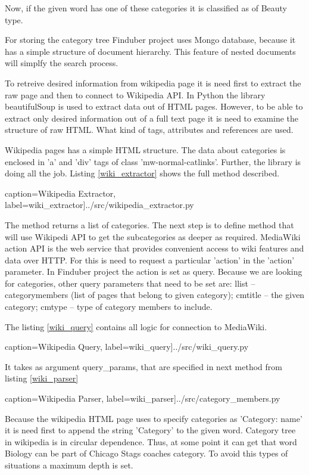 Now, if the given word has one of these categories it is classified as of Beauty type. 

For storing the category tree Finduber project uses Mongo database, because it has a simple structure of document hierarchy. This feature of nested documents will simplfy the search process. 

To retreive desired information from wikipedia page it is need first to extract the raw page and then to connect to Wikipedia API. In Python the library beautifulSoup is used to extract data out of HTML pages. However, to be able to extract only desired information out of a full text page it is need to examine the structure of raw HTML. What kind of tags, attributes and references are used.

Wikipedia pages has a simple HTML structure. The data about categories is enclosed in 'a' and 'div' tags of class 'mw-normal-catlinks'. Further, the library is doing all the job. Listing \ref{wiki_extractor} shows the full method described.

 caption={Wikipedia Extractor}, label=wiki_extractor]{../src/wikipedia_extractor.py}

The method returns a list of categories. The next step is to define method that will use Wikipedi API to get the subcategories as deeper as required. MediaWiki action API is the web service that provides convenient access to wiki features and data over HTTP. For this is need to request a particular 'action' in the 'action' parameter. In Finduber project the action is set as query. Because we are looking for categories, other query parameters that need to be set are: llist -- categorymembers (list of pages that belong to given category); cmtitle -- the given category; cmtype -- type of category members to include.

The listing \ref{wiki_query} contains all logic for connection to MediaWiki. 

 caption={Wikipedia Query}, label=wiki_query]{../src/wiki_query.py}

It takes as argument query\_params, that are specified in next method from listing \ref{wiki_parser}

 caption={Wikipedia Parser}, label=wiki_parser]{../src/category_members.py}

Because the wikipedia HTML page uses to specify categories as 'Category: name' it is need first to append the string 'Category' to the given word. Category tree in wikipedia is in circular dependence. Thus, at some point it can get that word Biology can be part of Chicago Stags coaches category. To avoid this types of situations a maximum depth is set.

